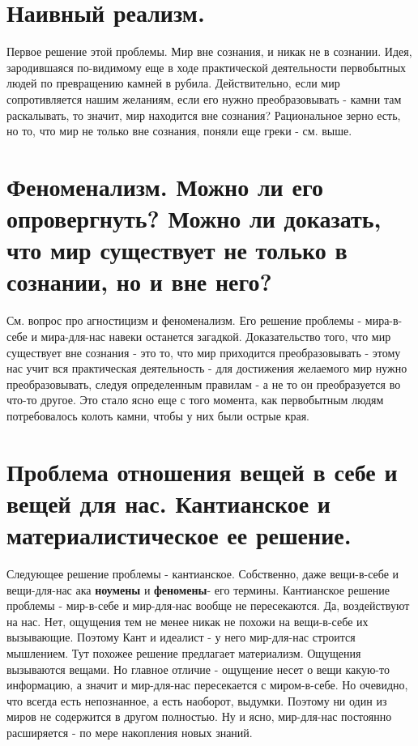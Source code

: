 \section{ Наивный реализм.}
Первое решение этой проблемы. Мир вне сознания, и никак не в сознании. Идея, зародившаяся по-видимому еще в ходе практической деятельности первобытных людей по превращению камней в рубила. Действительно, если мир сопротивляется нашим желаниям, если его нужно преобразовывать - камни там раскалывать, то значит, мир находится вне сознания? Рациональное зерно есть, но то, что мир не только вне сознания, поняли еще греки - см. выше.

\section{ Феноменализм. Можно ли его опровергнуть? Можно ли доказать, что мир существует не только в сознании, но и вне него?}
См. вопрос про агностицизм и феноменализм. Его решение проблемы - мира-в-себе и мира-для-нас навеки останется загадкой. Доказательство того, что мир существует вне сознания - это то, что мир приходится преобразовывать - этому нас учит вся практическая деятельность - для достижения желаемого мир нужно преобразовывать, следуя определенным правилам - а не то он преобразуется во что-то другое. Это стало ясно еще с того момента, как первобытным людям потребовалось колоть камни, чтобы у них были острые края. 

\section{ Проблема отношения вещей в себе и вещей для нас. Кантианское и материалистическое ее решение.}
Следующее решение проблемы - кантианское. Собственно, даже вещи-в-себе и вещи-для-нас ака \textbf{ноумены} и \textbf{феномены}- его термины. Кантианское решение проблемы - мир-в-себе и мир-для-нас вообще не пересекаются. Да, воздействуют на нас. Нет, ощущения тем не менее никак не похожи на вещи-в-себе их вызывающие. Поэтому Кант и идеалист - у него мир-для-нас строится мышлением. Тут похожее решение предлагает материализм. Ощущения вызываются вещами. Но главное отличие - ощущение несет о вещи какую-то информацию, а значит и мир-для-нас пересекается с миром-в-себе. Но очевидно, что всегда есть непознанное, а есть наоборот, выдумки. Поэтому ни один из миров не содержится в другом полностью. Ну и ясно, мир-для-нас постоянно расширяется - по мере накопления новых знаний.

